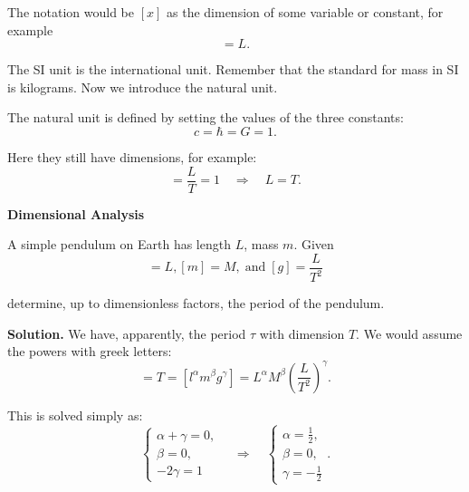 \documentclass[10pt]{article}
\begin{document}
	The notation would be $[x]$ as the dimension of some variable or constant, for example
	\begin{equation}
	  [x] = L.
	\end{equation}

	The SI unit is the international unit. Remember that the standard for mass in SI is kilograms. Now we introduce the natural unit. 

	\begin{definition}
		The natural unit is defined by setting the values of the three constants:
		\begin{equation}
	  	  c = \hbar = G = 1.
		\end{equation}
	\end{definition}

	Here they still have dimensions, for example:
	\begin{equation}
	  [c] = \frac{L}{T} = 1 \quad \Rightarrow \quad L = T.
	\end{equation}

	\noindent \textbf{Dimensional Analysis}

	\vspace{1\baselineskip}
	A simple pendulum on Earth has length $L$, mass $m$. Given
	\begin{equation}
	  [l] = L, [m] = M, \;\text{and}\; [g] = \frac{L}{T^{2}}
	\end{equation}

	determine, up to dimensionless factors, the period of the pendulum.

	\vspace{1\baselineskip}
	\textbf{Solution.} We have, apparently, the period $\tau$ with dimension $T$. We would assume the powers with greek letters:
	\begin{equation}
	  [\tau] = T = [l^{\alpha} m^{\beta} g^{\gamma}] = L^{\alpha} M^{\beta} \left(\frac{L}{T^{2}}\right)^{\gamma}.
	\end{equation}

	This is solved simply as:
	\begin{equation}
	  \begin{cases} \alpha + \gamma = 0, \\ \beta = 0, \\ -2\gamma = 1 \end{cases} \quad \Rightarrow \quad \begin{cases} \alpha = \frac{1}{2}, \\ \beta = 0, \\ \gamma = -\frac{1}{2} \end{cases}.
	\end{equation}
\end{document}
